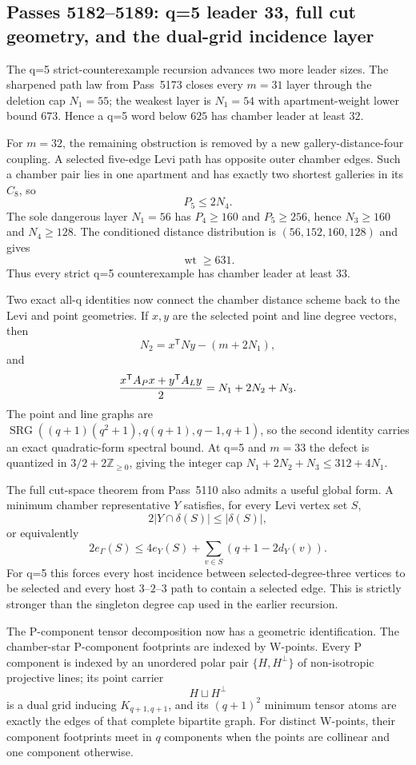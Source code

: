 \ifdefined\WPassFiveOneEightTwoLoaded\else
\gdef\WPassFiveOneEightTwoLoaded{1}
\subsection*{Passes 5182--5189: q=5 leader 33, full cut geometry, and the dual-grid incidence layer}
The q=5 strict-counterexample recursion advances two more leader sizes.  The sharpened path law from Pass~5173 closes every $m=31$ layer through the deletion cap $N_1=55$; the weakest layer is $N_1=54$ with apartment-weight lower bound $673$.  Hence a q=5 word below $625$ has chamber leader at least $32$.

For $m=32$, the remaining obstruction is removed by a new gallery-distance-four coupling.  A selected five-edge Levi path has opposite outer chamber edges.  Such a chamber pair lies in one apartment and has exactly two shortest galleries in its $C_8$, so
\[
  P_5\le 2N_4.
\]
The sole dangerous layer $N_1=56$ has $P_4\ge160$ and $P_5\ge256$, hence $N_3\ge160$ and $N_4\ge128$.  The conditioned distance distribution is $(56,152,160,128)$ and gives
\[
  \operatorname{wt}\ge631.
\]
Thus every strict q=5 counterexample has chamber leader at least $33$.

Two exact all-q identities now connect the chamber distance scheme back to the Levi and point geometries.  If $x,y$ are the selected point and line degree vectors, then
\[
  N_2=x^{\mathsf T}Ny-(m+2N_1),
\]
and
\[
  {x^{\mathsf T}A_Px+y^{\mathsf T}A_Ly\over2}=N_1+2N_2+N_3.
\]
The point and line graphs are
$\operatorname{SRG}((q+1)(q^2+1),q(q+1),q-1,q+1)$, so the second identity carries an exact quadratic-form spectral bound.  At q=5 and $m=33$ the defect is quantized in $3/2+2\mathbb Z_{\ge0}$, giving the integer cap $N_1+2N_2+N_3\le312+4N_1$.

The full cut-space theorem from Pass~5110 also admits a useful global form.  A minimum chamber representative $Y$ satisfies, for every Levi vertex set $S$,
\[
  2|Y\cap\delta(S)|\le|\delta(S)|,
\]
or equivalently
\[
  2e_\Gamma(S)\le4e_Y(S)+\sum_{v\in S}(q+1-2d_Y(v)).
\]
For q=5 this forces every host incidence between selected-degree-three vertices to be selected and every host $3$--$2$--$3$ path to contain a selected edge.  This is strictly stronger than the singleton degree cap used in the earlier recursion.

The P-component tensor decomposition now has a geometric identification.  The chamber-star P-component footprints are indexed by W-points.  Every P component is indexed by an unordered polar pair $\{H,H^\perp\}$ of non-isotropic projective lines; its point carrier
\[
  H\sqcup H^\perp
\]
is a dual grid inducing $K_{q+1,q+1}$, and its $(q+1)^2$ minimum tensor atoms are exactly the edges of that complete bipartite graph.  For distinct W-points, their component footprints meet in $q$ components when the points are collinear and one component otherwise.

